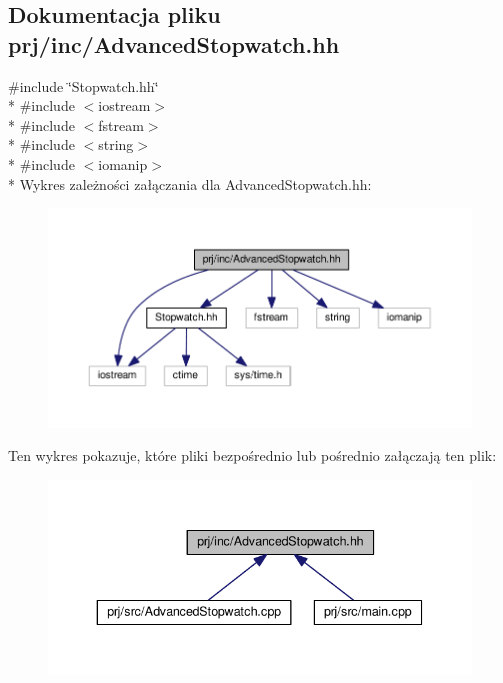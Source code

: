 \hypertarget{_advanced_stopwatch_8hh}{\subsection{Dokumentacja pliku prj/inc/\-Advanced\-Stopwatch.hh}
\label{_advanced_stopwatch_8hh}
}
{\ttfamily \#include \char`\"{}Stopwatch.\-hh\char`\"{}}\\*
{\ttfamily \#include $<$iostream$>$}\\*
{\ttfamily \#include $<$fstream$>$}\\*
{\ttfamily \#include $<$string$>$}\\*
{\ttfamily \#include $<$iomanip$>$}\\*
Wykres zależności załączania dla Advanced\-Stopwatch.\-hh\-:
\nopagebreak
\begin{figure}[H]
\begin{center}
\leavevmode
\includegraphics[width=350pt]{_advanced_stopwatch_8hh__incl}
\end{center}
\end{figure}
Ten wykres pokazuje, które pliki bezpośrednio lub pośrednio załączają ten plik\-:
\nopagebreak
\begin{figure}[H]
\begin{center}
\leavevmode
\includegraphics[width=339pt]{_advanced_stopwatch_8hh__dep__incl}
\end{center}
\end{figure}

